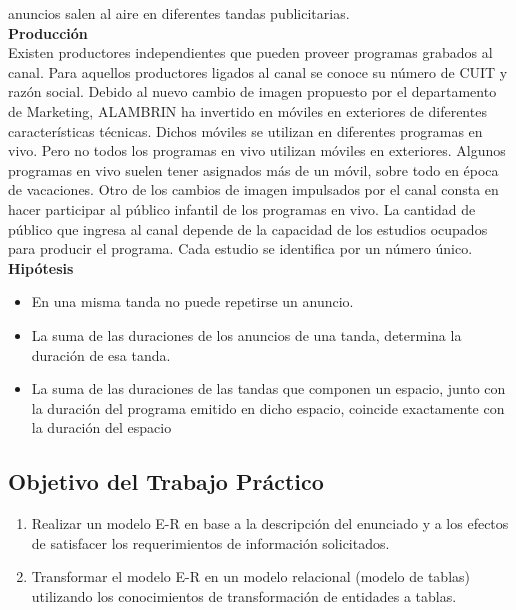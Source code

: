\documentclass[a4paper,10pt,titlepage]{article}
\begin{document}
anuncios salen al aire en diferentes tandas publicitarias.
\\ \textbf{Producci\'on}\\
Existen productores independientes que pueden proveer programas grabados al canal. Para aquellos
productores ligados al canal se conoce su n\'umero de CUIT y raz\'on social.
Debido al nuevo cambio de imagen propuesto por el departamento de Marketing, ALAMBRIN ha invertido en
m\'oviles en exteriores de diferentes características t\'ecnicas. Dichos m\'oviles se utilizan en diferentes programas
en vivo. Pero no todos los programas en vivo utilizan m\'oviles en exteriores. Algunos programas en vivo suelen
tener asignados m\'as de un m\'ovil, sobre todo en \'epoca de vacaciones.
Otro de los cambios de imagen impulsados por el canal consta en hacer participar al p\'ublico infantil de los
programas en vivo. La cantidad de p\'ublico que ingresa al canal depende de la capacidad de los estudios
ocupados para producir el programa. Cada estudio se identifica por un n\'umero \'unico.
\\ \textbf{Hip\'otesis}\\
\begin{itemize}
\item En una misma tanda no puede repetirse un anuncio.
\item La suma de las duraciones de los anuncios de una tanda, determina la duraci\'on de esa tanda.
\item La suma de las duraciones de las tandas que componen un espacio, junto con la duraci\'on del programa
emitido en dicho espacio, coincide exactamente con la duraci\'on del espacio
\end{itemize}

\subsection{Objetivo del Trabajo Pr\'actico}

\begin{enumerate}
\item Realizar un modelo E-R en base a la descripci\'on del enunciado y a los efectos de satisfacer los
requerimientos de informaci\'on solicitados.
\item Transformar el modelo E-R en un modelo relacional (modelo de tablas) utilizando los conocimientos de
transformaci\'on de entidades a tablas.
\end{enumerate}
\end{document}
